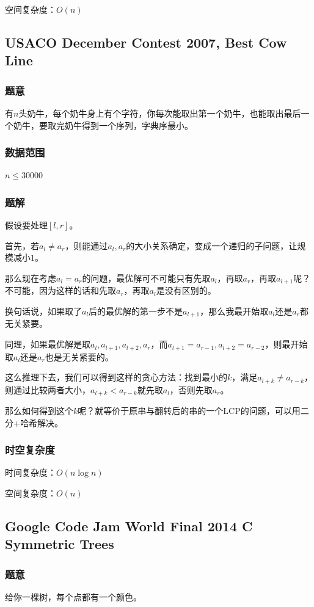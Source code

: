 \documentclass{ctexart}
\begin{document}
空间复杂度：$O(n)$
\subsection{USACO December Contest 2007, Best Cow Line}
\subsubsection{题意}
有$n$头奶牛，每个奶牛身上有个字符，你每次能取出第一个奶牛，也能取出最后一个奶牛，要取完奶牛得到一个序列，字典序最小。
\subsubsection{数据范围}
$n \le 30000$
\subsubsection{题解}
假设要处理$[l,r]$。

首先，若$a_l \neq a_r$，则能通过$a_l,a_r$的大小关系确定，变成一个递归的子问题，让规模减小$1$。

那么现在考虑$a_l=a_r$的问题，最优解可不可能只有先取$a_l$，再取$a_r$，再取$a_{l+1}$呢？不可能，因为这样的话和先取$a_r$，再取$a_l$是没有区别的。

换句话说，如果取了$a_l$后的最优解的第一步不是$a_{l+1}$，那么我最开始取$a_l$还是$a_r$都无关紧要。

同理，如果最优解是取$a_l,a_{l+1},a_{l+2},a_r$，而$a_{l+1}=a_{r-1},a_{l+2}=a_{r-2}$，则最开始取$a_l$还是$a_r$也是无关紧要的。

这么推理下去，我们可以得到这样的贪心方法：找到最小的$k$，满足$a_{l+k} \neq a_{r-k}$，则通过比较两者大小，$a_{l+k}<a_{r-k}$就先取$a_l$，否则先取$a_r$。

那么如何得到这个$k$呢？就等价于原串与翻转后的串的一个LCP的问题，可以用二分+哈希解决。
\subsubsection{时空复杂度}
时间复杂度：$O(n \log n)$

空间复杂度：$O(n)$
\subsection{Google Code Jam World Final 2014 C Symmetric Trees}
\subsubsection{题意}
给你一棵树，每个点都有一个颜色。
\end{document}
